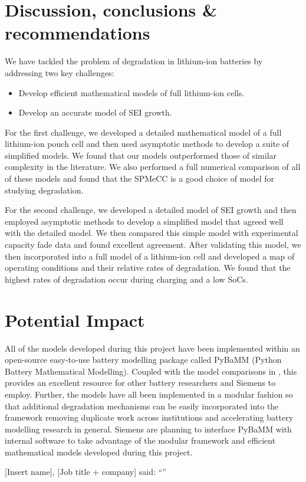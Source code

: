 \documentclass[english,a4paper,oneside,9pt]{extarticle}
\begin{document}
\newpage
\section{Discussion, conclusions \& recommendations}
We have tackled the problem of degradation in lithium-ion batteries by addressing two key challenges:
\begin{itemize}
	\item Develop efficient mathematical models of full lithium-ion cells.
	\item Develop an accurate model of SEI growth.
\end{itemize}
For the first challenge, we developed a detailed mathematical model of a full lithium-ion pouch cell and then used asymptotic methods to develop a suite of simplified models. We found that our models outperformed those of similar complexity in the literature. We also performed a full numerical comparison of all of these models and found that the SPMeCC is a good choice of model for studying degradation.

For the second challenge, we developed a detailed model of SEI growth and then employed asymptotic methods to develop a simplified model that agreed well with the detailed model. We then compared this simple model with experimental capacity fade data and found excellent agreement. After validating this model, we then incorporated into a full model of a lithium-ion cell and developed a map of operating conditions and their relative rates of degradation. We found that the highest rates of degradation occur during charging and a low SoCs.


\section{Potential Impact}
All of the models developed during this project have been implemented within an open-source easy-to-use battery modelling package called PyBaMM (Python Battery Mathematical Modelling). Coupled with the model comparisons in , this provides an excellent resource for other battery researchers and Siemens to employ. Further, the models have all been implemented in a modular fashion so that additional degradation mechanisms can be easily incorporated into the framework removing duplicate work across institutions and accelerating battery modelling research in general. Siemens are planning to interface PyBaMM with internal software to take advantage of the modular framework and efficient mathematical models developed during this project.

[Insert name], [Job title + company] said: ``\emph{}''

% 

\clearpage
\end{document}
